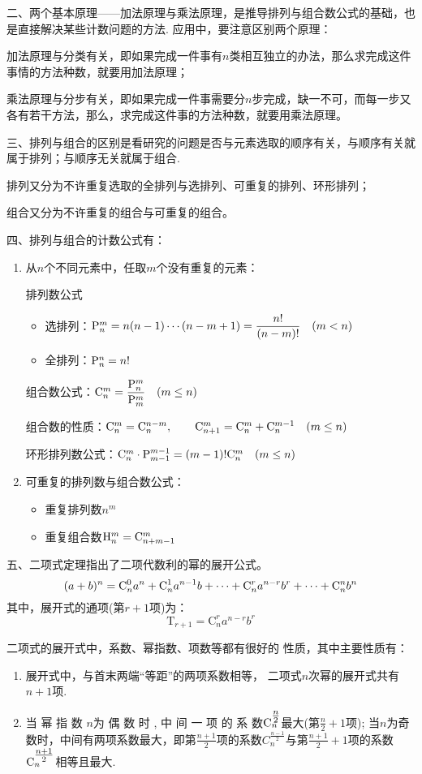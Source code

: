 二、两个基本原理——加法原理与乘法原理，是推导排列与组合数公式的基础，也是直接解决某些计数问题的方法. 应用中，要注意区别两个原理：

加法原理与分类有关，即如果完成一件事有$n$类相互独立的办法，那么求完成这件事情的方法种数，就要用加法原理；

乘法原理与分步有关，即如果完成一件事需要分$n$步完成，缺一不可，而每一步又各有若干方法，那么，求完成这件事的方法种数，就要用乘法原理。

三、排列与组合的区别是看研究的问题是否与元素选取的顺序有关，与顺序有关就属于排列；与顺序无关就属于组合.

排列又分为不许重复选取的全排列与选排列、可重复的排列、环形排列；

组合又分为不许重复的组合与可重复的组合。

四、排列与组合的计数公式有：
\begin{enumerate}
    \item 从$n$个不同元素中，任取$m$个没有重复的元素：

排列数公式
\begin{itemize}
    \item 选排列：${\rm P}^{m}_{n}=n(n-1)\cdots(n-m+1)=\dfrac{n!}{(n-m)!}\quad (m<n)$
    \item 全排列：${\rm P}^{n}_{n}=n!$
\end{itemize}

组合数公式：${\rm C}^{m}_{n}=\dfrac{{\rm P}^{m}_{n}}{{\rm P}^{m}_{m}}\quad (m\le n)$

组合数的性质：${\rm C}^{m}_{n}={\rm C}^{n-m}_{n},\qquad {\rm C}^{m}_{n+1}={\rm C}^{m}_{n}+{\rm C}^{m-1}_{n}\quad (m\le n)$

环形排列数公式：${\rm C}^{m}_{n}\cdot {\rm P}^{m-1}_{m-1}=(m-1)! {\rm C}^{m}_{n}\quad (m\le n)$

\item 可重复的排列数与组合数公式：
\begin{itemize}
    \item 重复排列数$n^m$
    \item 重复组合数${\rm H}^m_n={\rm C}^{m}_{n+m-1}$
\end{itemize}
\end{enumerate}

五、二项式定理指出了二项代数利的幂的展开公式。
\[(a+ b) ^{n}=\mathrm{C}_{n}^{0}a^{n}+{\rm C}_n^{1}a^{n- 1}b+ \cdots + \mathrm{C}_{n}^{r}a^{n- r}b^{r}+ \cdots + \mathrm{C} _{n}^{n}b^{n}\]
其中，展开式的通项(第$r+1$项)为：
$$\mathrm{T}_{r+1}=\mathrm{C}_{n}^{r}a^{n-r}b^{r}$$

二项式的展开式中，系数、幂指数、项数等都有很好的
性质，其中主要性质有：
\begin{enumerate}
    \item 
展开式中，与首末两端“等距”的两项系数相等，
二项式$n$次幂的展开式共有$n+1$项.
\item 
当 幂 指 数 $n$为 偶 数 时 , 中 间 一 项 的 系 数${\rm C}_n^{\tfrac{n}{2}}$最大(第$\frac n2+1$项); 当$n$为奇数时，中间有两项系数最大，即第$\frac{n+1}2$项的系数$C_{n}^{\tfrac{n-1}2}$与第$\frac{n+1}2+1$项的系数${\rm C}_{n}^{\tfrac{n+1}2}$相等且最大.
\end{enumerate}

